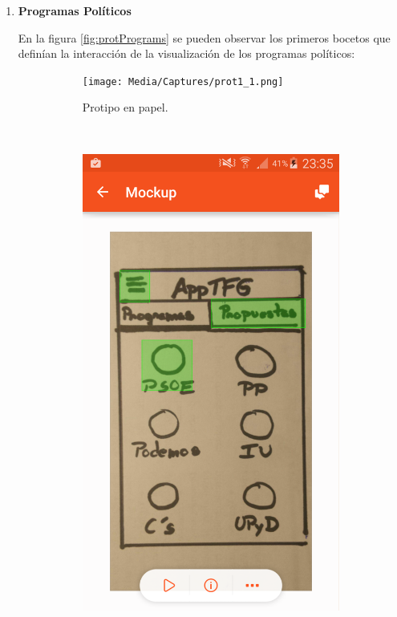 \begin{enumerate}[label=\textbf{\arabic*})]
 \item \textbf{Programas Políticos}
 
 En la figura \ref{fig:protPrograms} se pueden observar los primeros bocetos que definían la interacción de la visualización de los programas políticos:
 
 	\begin{figure}[!]
        \centering
        \begin{subfigure}[b]{0.3\textwidth}
                \texttt{[image: Media/Captures/prot1\_1.png]}
                \caption{Protipo en papel.}
                \label{fig:quipDesktop}
        \end{subfigure}
        ~
        \begin{subfigure}[b]{0.3\textwidth}
                \includegraphics[width=\textwidth]{Media/Captures/prot1_2.png}

\end{subfigure}
\end{figure}
\end{enumerate}
